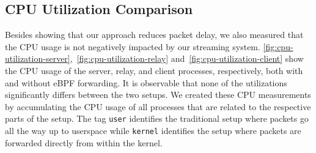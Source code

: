 \subsection{CPU Utilization Comparison}
Besides showing that our approach reduces packet delay, we also measured that the CPU usage is 
not negatively impacted by our streaming system.
\autoref{fig:cpu-utilization-server},~\ref{fig:cpu-utilization-relay} and~\ref{fig:cpu-utilization-client}
show the CPU usage of the server, relay, and client processes, respectively, both with and without eBPF forwarding.
It is observable that none of the utilizations significantly differs between the two setups.
We created these CPU measurements by accumulating the CPU usage of all processes that are related 
to the respective parts of the setup.
The tag \verb|user| identifies the traditional setup where packets go all the way up to userspace while 
\verb|kernel| identifies the setup where packets are forwarded directly from within the kernel.

